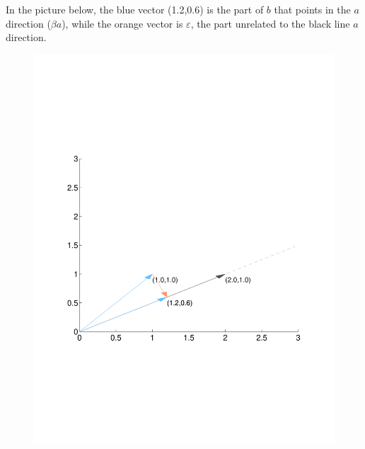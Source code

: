 \documentclass[a4paper,12pt]{scrartcl}
\begin{document}
In the picture below, the blue vector (1.2,0.6) is the part of $b$ that
points in the $a$ direction ($\beta a$), while the orange vector is
$\varepsilon$, the part unrelated to the black line $a$ direction.

\begin{figure}[htpb!]
  \centering
  \includegraphics[scale=0.5, trim={2cm, 7.2cm, 2cm, 7.2cm}, clip]{Plots/StateSpaceGeometry3.pdf}
\end{figure}
\end{document}
